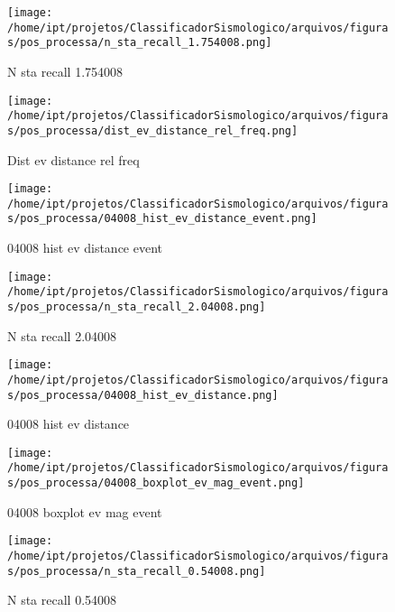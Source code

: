     \begin{figure}[H]
        \centering
        \texttt{[image: /home/ipt/projetos/ClassificadorSismologico/arquivos/figuras/pos\_processa/n\_sta\_recall\_1.754008.png]}
        \caption{N sta recall 1.754008}
        \label{fig:n_sta_recall_1.754008}
    \end{figure}
                

    \begin{figure}[H]
        \centering
        \texttt{[image: /home/ipt/projetos/ClassificadorSismologico/arquivos/figuras/pos\_processa/dist\_ev\_distance\_rel\_freq.png]}
        \caption{Dist ev distance rel freq}
        \label{fig:dist_ev_distance_rel_freq}
    \end{figure}
                

    \begin{figure}[H]
        \centering
        \texttt{[image: /home/ipt/projetos/ClassificadorSismologico/arquivos/figuras/pos\_processa/04008\_hist\_ev\_distance\_event.png]}
        \caption{04008 hist ev distance event}
        \label{fig:04008_hist_ev_distance_event}
    \end{figure}
                

    \begin{figure}[H]
        \centering
        \texttt{[image: /home/ipt/projetos/ClassificadorSismologico/arquivos/figuras/pos\_processa/n\_sta\_recall\_2.04008.png]}
        \caption{N sta recall 2.04008}
        \label{fig:n_sta_recall_2.04008}
    \end{figure}
                

    \begin{figure}[H]
        \centering
        \texttt{[image: /home/ipt/projetos/ClassificadorSismologico/arquivos/figuras/pos\_processa/04008\_hist\_ev\_distance.png]}
        \caption{04008 hist ev distance}
        \label{fig:04008_hist_ev_distance}
    \end{figure}
                

    \begin{figure}[H]
        \centering
        \texttt{[image: /home/ipt/projetos/ClassificadorSismologico/arquivos/figuras/pos\_processa/04008\_boxplot\_ev\_mag\_event.png]}
        \caption{04008 boxplot ev mag event}
        \label{fig:04008_boxplot_ev_mag_event}
    \end{figure}
                

    \begin{figure}[H]
        \centering
        \texttt{[image: /home/ipt/projetos/ClassificadorSismologico/arquivos/figuras/pos\_processa/n\_sta\_recall\_0.54008.png]}
        \caption{N sta recall 0.54008}
        \label{fig:n_sta_recall_0.54008}
    \end{figure}
                

